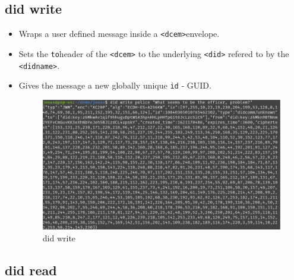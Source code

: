 \hypertarget{did-write}{%
\subsection{\texorpdfstring{did write }{did write  }}\label{did-write}}

\begin{itemize}
\item
  Wraps a user defined message inside a
  \lstinline!<dcem>!envelope.
\item
  Sets the \lstinline!to!header of the
  \lstinline!<dcem>! to the underlying
  \lstinline!<did>! refered to by the
  \lstinline!<didname>!.
\item
  Gives the message a new globally unique \lstinline!id! -
  GUID.

  \begin{figure}
  \centering
  \includegraphics[width=\textwidth]{User Interface f8759a9462b24d5f95cf6123d68b89ea/Untitled 6.png}
  \caption{did write}
  \end{figure}
\end{itemize}

\hypertarget{did-read}{%
\subsection{\texorpdfstring{did read }{did read }}\label{did-read}}

